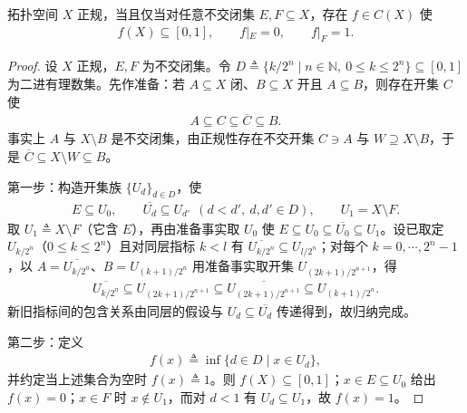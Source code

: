 \documentclass[../main.tex]{subfiles}
\begin{document}
\begin{proposition}[Urysohn 引理]\label{proposition:appA-Urysohn}
拓扑空间 $X$ 正规，当且仅当对任意不交闭集 $E,F\subseteq X$，存在 $f\in C(X)$ 使
\begin{align*}
f(X)\subseteq[0,1],\qquad f|_E=0,\qquad f|_F=1.
\end{align*}
\end{proposition}

\begin{proof}
设 $X$ 正规，$E,F$ 为不交闭集。令 $D\triangleq\{k/2^n\mid n\in\mathbb{N},\ 0\leqslant k\leqslant2^n\}\subseteq[0,1]$ 为二进有理数集。先作准备：若 $A\subseteq X$ 闭、$B\subseteq X$ 开且 $A\subseteq B$，则存在开集 $C$ 使
\begin{align*}
A\subseteq C\subseteq\overline{C}\subseteq B.
\end{align*}
事实上 $A$ 与 $X\setminus B$ 是不交闭集，由正规性存在不交开集 $C\ni A$ 与 $W\supseteq X\setminus B$，于是 $\overline{C}\subseteq X\setminus W\subseteq B$。

第一步：构造开集族 $\{U_d\}_{d\in D}$，使
\begin{align*}
E\subseteq U_0,\qquad \overline{U_d}\subseteq U_{d'}\ \ (d<d',\ d,d'\in D),\qquad U_1=X\setminus F.
\end{align*}
取 $U_1\triangleq X\setminus F$（它含 $E$），再由准备事实取 $U_0$ 使 $E\subseteq U_0\subseteq\overline{U_0}\subseteq U_1$。设已取定 $U_{k/2^n}$（$0\leqslant k\leqslant2^n$）且对同层指标 $k<l$ 有 $\overline{U_{k/2^n}}\subseteq U_{l/2^n}$；对每个 $k=0,\cdots ,2^n-1$，以 $A=\overline{U_{k/2^n}}$、$B=U_{(k+1)/2^n}$ 用准备事实取开集 $U_{(2k+1)/2^{n+1}}$，得
\begin{align*}
\overline{U_{k/2^n}}\subseteq U_{(2k+1)/2^{n+1}}\subseteq\overline{U_{(2k+1)/2^{n+1}}}\subseteq U_{(k+1)/2^n}.
\end{align*}
新旧指标间的包含关系由同层的假设与 $U_d\subseteq\overline{U_d}$ 传递得到，故归纳完成。

第二步：定义
\begin{align*}
f(x)\triangleq\inf\{d\in D\mid x\in U_d\},
\end{align*}
并约定当上述集合为空时 $f(x)\triangleq1$。则 $f(X)\subseteq[0,1]$；$x\in E\subseteq U_0$ 给出 $f(x)=0$；$x\in F$ 时 $x\notin U_1$，而对 $d<1$ 有 $U_d\subseteq U_1$，故 $f(x)=1$。


\end{proof}
\end{document}
